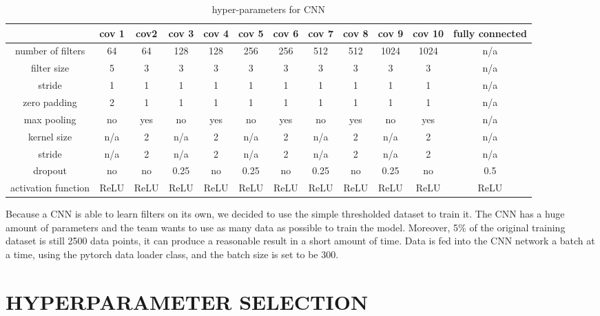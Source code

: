 \documentclass[letterpaper, 10 pt, conference]{ieeeconf}  %
\begin{document}
\begin{table}[t]
	\centering
	\caption{hyper-parameters for CNN}
	\label{tab:hyperparams}
	\begin{tabular}{|c|c|c|c|c|c|c|c|c|c|c|c|}
		\hline
	&cov 1	&cov2	&cov 3	&cov 4	&cov 5	&cov 6	&cov 7&	cov 8&	cov 9	&cov 10&	fully connected\\\hline
number of filters&	64	&64	&128	&128	&256	&256	&512	&512&	1024	&1024	&n/a \\\hline
filter size&5&3	&3	&3	&3	&3	&3	&3	&3	&3	&n/a\\\hline
stride	&1	&1	&1	&1	&1	&1	&1	&1	&1	&1	&n/a\\\hline
zero padding &2	&1	&1	&1	&1	&1	&1	&1	&1	&1	&n/a\\\hline
max pooling	&no&	yes&	no&	yes&	no&	yes&	no&	yes&	no	&yes&n/a\\\hline
kernel size&	n/a&	2&	n/a&	2&	n/a&	2	&n/a	&2	&n/a&2&n/a\\\hline
stride	&n/a&2&	n/a	&2	&n/a&2	&n/a&2	&n/a&2&	n/a\\\hline
dropout	&no&	no&	0.25&	no	&0.25&	no&	0.25&no&0.25&no&0.5\\\hline
activation function &	ReLU&	ReLU&	ReLU&	ReLU&	ReLU&	ReLU&	ReLU&	ReLU	&ReLU&	ReLU&	ReLU\\\hline
\end{tabular}
\end{table}
Because a CNN is able to learn filters on its own, we decided to use the simple thresholded dataset to train it. The CNN has a huge amount of parameters and the team wants to use as many data as possible to train the model. Moreover, 5\% of the original training dataset is still 2500 data points, it can produce a reasonable result in a short amount of time. 
Data is fed into the CNN network a batch at a time, using the pytorch data loader class, and the batch size is set to be 300.


\section{HYPERPARAMETER SELECTION}\label{sec:hyperParams}
\end{document}
